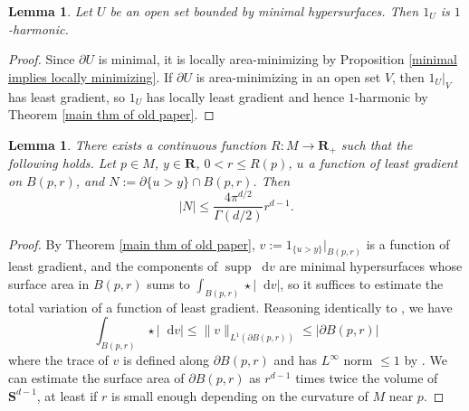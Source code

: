 \documentclass[reqno,11pt]{amsart}
\newcommand{\RR}{\mathbf{R}}
\newcommand{\Sph}{\mathbf S}
\newcommand*\dif{\mathop{}\!\mathrm{d}}
\DeclareMathOperator{\supp}{supp}
\newtheorem{lemma}[theorem]{Lemma}
\theoremstyle{definition}
\numberwithin{equation}{section}
\begin{document}
\begin{lemma}\label{minimal implies 1 harmonic}
Let $U$ be an open set bounded by minimal hypersurfaces.
Then $1_U$ is $1$-harmonic.
\end{lemma}
\begin{proof}
Since $\partial U$ is minimal, it is locally area-minimizing by Proposition \ref{minimal implies locally minimizing}.
If $\partial U$ is area-minimizing in an open set $V$, then $1_U|_V$ has least gradient, so $1_U$ has locally least gradient and hence $1$-harmonic by Theorem \ref{main thm of old paper}.
\end{proof}

\begin{lemma}
There exists a continuous function $R: M \to \RR_+$ such that the following holds.
Let $p \in M$, $y \in \RR$, $0 < r \leq R(p)$, $u$ a function of least gradient on $B(p, r)$, and $N := \partial \{u > y\} \cap B(p, r)$.
Then 
\begin{equation}\label{least gradient area bound}
|N| \leq \frac{4\pi^{d/2}}{\Gamma(d/2)} r^{d - 1}.
\end{equation}
\end{lemma}
\begin{proof}
By Theorem \ref{main thm of old paper}, $v := 1_{\{u > y\}}|_{B(p, r)}$ is a function of least gradient, and the components of $\supp \dif v$ are minimal hypersurfaces whose surface area in $B(p, r)$ sums to $\int_{B(p, r)} \star |\dif v|$, so it suffices to estimate the total variation of a function of least gradient.
Reasoning identically to \cite[Lemma 5.6]{Giusti77}, we have 
$$\int_{B(p, r)} \star |\dif v| \leq \|v\|_{L^1(\partial B(p, r))} \leq |\partial B(p, r)|$$
where the trace of $v$ is defined along $\partial B(p, r)$ and has $L^\infty$ norm $\leq 1$ by \cite[Theorem 2.10]{Giusti77}.
We can estimate the surface area of $\partial B(p, r)$ as $r^{d - 1}$ times twice the volume of $\Sph^{d - 1}$, at least if $r$ is small enough depending on the curvature of $M$ near $p$.
\end{proof}
\end{document}
